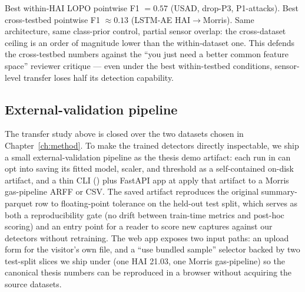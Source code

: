 Best within-HAI LOPO pointwise F1 $= 0.57$ (USAD, drop-P3, P1-attacks).  Best cross-testbed  pointwise F1 $\approx 0.13$ (LSTM-AE HAI$\rightarrow$Morris).  Same architecture, same class-prior control, partial sensor overlap: the cross-dataset ceiling is an order of magnitude lower than the within-dataset one.  This defends the cross-testbed numbers against the ``you just need a better common feature space'' reviewer critique --- even under the best within-testbed conditions, sensor-level transfer loses half its detection capability.

\subsection{External-validation pipeline}
\label{sec:external-validation}

The transfer study above is closed over the two datasets chosen in Chapter~\ref{ch:method}.  To make the trained detectors directly inspectable, we ship a small external-validation pipeline as the thesis demo artifact: each run in  can opt into saving its fitted model, scaler, and threshold as a self-contained on-disk artifact, and a thin CLI () plus FastAPI app at  apply that artifact to a Morris gas-pipeline ARFF or CSV.  The saved artifact reproduces the original summary-parquet row to floating-point tolerance on the held-out test split, which serves as both a reproducibility gate (no drift between train-time metrics and post-hoc scoring) and an entry point for a reader to score new captures against our detectors without retraining.  The web app exposes two input paths: an upload form for the visitor's own file, and a ``use bundled sample'' selector backed by two test-split slices we ship under  (one HAI 21.03, one Morris gas-pipeline) so the canonical thesis numbers can be reproduced in a browser without acquiring the source datasets.
